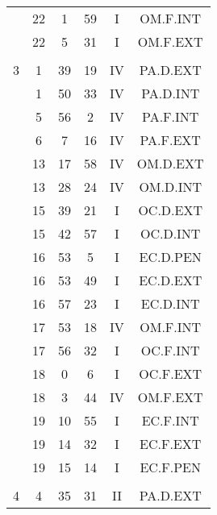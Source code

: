 \documentclass[12pt, a4paper]{article}
\begin{document}
\begin{multicols}{3}
{\begin{tabular}{c c c c c c}
	 	 	 	 & 22 & 1 & 59 & I & OM.F.INT\\%
	 	 	 	 & 22 & 5 & 31 & I & OM.F.EXT\\%
	 	 	 	 & & & & & \\%
	 	 	 	3 & 1 & 39 & 19 & IV & PA.D.EXT\\%
	 	 	 	 & 1 & 50 & 33 & IV & PA.D.INT\\%
	 	 	 	 & 5 & 56 & 2 & IV & PA.F.INT\\%
	 	 	 	 & 6 & 7 & 16 & IV & PA.F.EXT\\%
	 	 	 	 & 13 & 17 & 58 & IV & OM.D.EXT\\%
	 	 	 	 & 13 & 28 & 24 & IV & OM.D.INT\\%
	 	 	 	 & 15 & 39 & 21 & I & OC.D.EXT\\%
	 	 	 	 & 15 & 42 & 57 & I & OC.D.INT\\%
	 	 	 	 & 16 & 53 & 5 & I & EC.D.PEN\\%
	 	 	 	 & 16 & 53 & 49 & I & EC.D.EXT\\%
	 	 	 	 & 16 & 57 & 23 & I & EC.D.INT\\%
	 	 	 	 & 17 & 53 & 18 & IV & OM.F.INT\\%
	 	 	 	 & 17 & 56 & 32 & I & OC.F.INT\\%
	 	 	 	 & 18 & 0 & 6 & I & OC.F.EXT\\%
	 	 	 	 & 18 & 3 & 44 & IV & OM.F.EXT\\%
	 	 	 	 & 19 & 10 & 55 & I & EC.F.INT\\%
	 	 	 	 & 19 & 14 & 32 & I & EC.F.EXT\\%
	 	 	 	 & 19 & 15 & 14 & I & EC.F.PEN\\%
	 	 	 	 & & & & & \\%
	 	 	 	4 & 4 & 35 & 31 & II & PA.D.EXT\\%

\end{tabular}}
\end{multicols}
\end{document}
